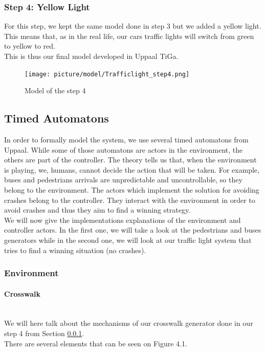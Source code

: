 \subsubsection{Step 4: Yellow Light}\label{sec:step4}
For this step, we kept the same model done in step 3 but we added a yellow light. This means that, as in the real life, our cars traffic lights will switch from green to yellow to red. \\
This is thus our final model developed in Uppaal TiGa.

\begin{figure}[H]\label{fig:step4}
  \centering
    \texttt{[image: picture/model/Trafficlight\_step4.png]}
    \caption{Model of the step 4}
\end{figure}

\subsection{Timed Automatons}
In order to formally model the system, we use several timed automatons from Uppaal. While some of those automatons are actors in the environment, the others are part of the controller.
The theory tells us that, when the environment is playing, we, humans, cannot decide the action that will be taken. For example, buses and pedestrians arrivals are unpredictable and uncontrollable, so they belong to the environment.
The actors which implement the solution for avoiding crashes belong to the controller. They interact with the environment in order to avoid crashes and thus they aim to find a winning strategy. \\
We will now give the implementations explanations of the environment and controller actors. In the first one, we will take a look at the pedestrians and buses generators while in the second one, we will look at our traffic light system that tries to find a winning situation (no crashes).

\subsubsection{Environment}
\paragraph{Crosswalk} \mbox{}\\
We will here talk about the mechanisms of our crosswalk generator done in our step 4 from Section \ref{sec:step4}. \\
There are several elements that can be seen on Figure 4.1.

